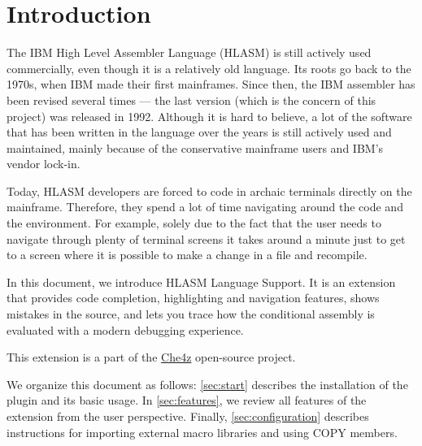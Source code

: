 \section{Introduction}

The IBM High Level Assembler Language (HLASM) is still actively used commercially, even though it is a relatively old language. Its roots go back to the 1970s, when IBM made their first mainframes. Since then, the IBM assembler has been revised several times --- the last version (which is the concern of this project) was released in 1992. Although it is hard to believe, a lot of the software that has been written in the language over the years is still actively used and maintained, mainly because of the conservative mainframe users and IBM's vendor lock-in.

Today, HLASM developers are forced to code in archaic terminals directly on the mainframe. Therefore, they spend a lot of time navigating around the code and the environment. For example, solely due to the fact that the user needs to navigate through plenty of terminal screens it takes around a minute just to get to a screen where it is possible to make a change in a file and recompile.

In this document, we introduce HLASM Language Support. It is an extension that provides code completion, highlighting and navigation features, shows mistakes in the source, and lets you trace how the conditional assembly is evaluated with a modern debugging experience.

This extension is a part of the \href{https://github.com/eclipse/che-che4z}{Che4z} open-source project.

We organize this document as follows: \cref{sec:start} describes the installation of the plugin and its basic usage. In \cref{sec:features}, we review all features of the extension from the user perspective. Finally, \cref{sec:configuration} describes instructions for importing external macro libraries and using COPY members.
